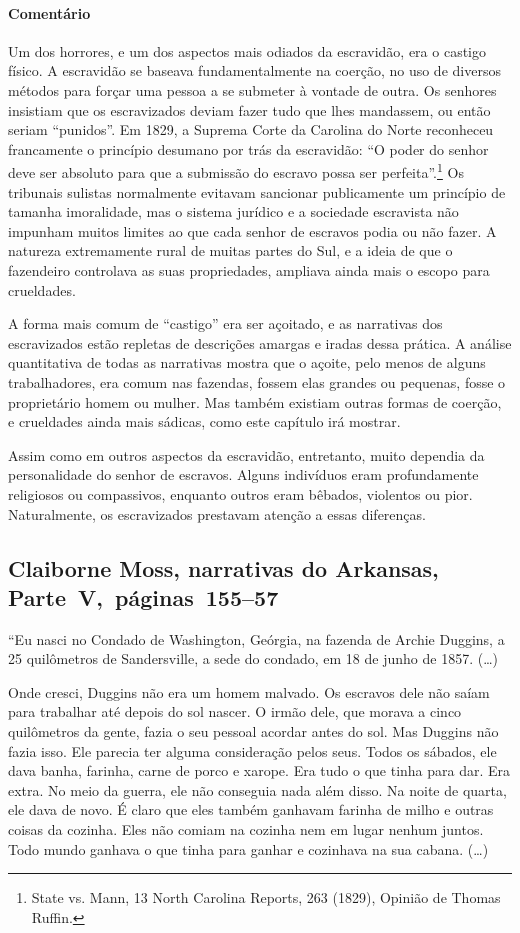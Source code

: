\paragraph{Comentário}\quad
{\small
Um dos horrores, e um dos aspectos mais odiados da escravidão, era
o castigo físico. A escravidão se baseava fundamentalmente na coerção,
no uso de diversos métodos para forçar uma pessoa a se submeter à
vontade de outra. Os senhores insistiam que os escravizados deviam fazer
tudo que lhes mandassem, ou então seriam ``punidos''. Em 1829, a Suprema
Corte da Carolina do Norte reconheceu francamente o princípio desumano
por trás da escravidão: ``O poder do senhor deve ser absoluto para que a
submissão do escravo possa ser perfeita''.\footnote{State vs. Mann, 13
  North Carolina Reports, 263 (1829), Opinião de Thomas Ruffin.}
Os tribunais sulistas normalmente evitavam sancionar publicamente
um princípio de tamanha imoralidade, mas o sistema jurídico e a
sociedade escravista não impunham muitos limites ao que cada senhor de
escravos podia ou não fazer. A natureza extremamente rural de muitas
partes do Sul, e a ideia de que o fazendeiro controlava as suas
propriedades, ampliava ainda mais o escopo para crueldades.

A forma mais comum de ``castigo'' era ser açoitado, e as
narrativas dos escravizados estão repletas de descrições amargas e iradas
dessa prática. A análise quantitativa de todas as narrativas mostra que
o açoite, pelo menos de alguns trabalhadores, era comum nas fazendas, fossem
elas grandes ou pequenas, fosse o proprietário homem ou mulher. Mas
também existiam outras formas de coerção, e crueldades ainda mais
sádicas, como este capítulo irá mostrar.

Assim como em outros aspectos da escravidão, entretanto, muito
dependia da personalidade do senhor de escravos. Alguns indivíduos eram
profundamente religiosos ou compassivos, enquanto outros eram bêbados,
violentos ou pior. Naturalmente, os escravizados prestavam atenção a essas
diferenças.
}

\subsection{Claiborne Moss, narrativas do Arkansas, Parte~V,~páginas~155--57}
\label{ref203}

``Eu nasci no Condado de Washington, Geórgia, na fazenda de Archie
Duggins, a 25 quilômetros de Sandersville, a sede do condado, em 18 de
junho de 1857. (\ldots{})

Onde cresci, Duggins não era um homem malvado. Os escravos dele não
saíam para trabalhar até depois do sol nascer. O irmão dele, que morava
a cinco quilômetros da gente, fazia o seu pessoal acordar antes do sol.
Mas Duggins não fazia isso. Ele parecia ter alguma consideração pelos
seus. Todos os sábados, ele dava banha, farinha, carne de porco e
xarope. Era tudo o que tinha para dar. Era extra. No meio da guerra, ele
não conseguia nada além disso. Na noite de quarta, ele dava de novo. É
claro que eles também ganhavam farinha de milho e outras coisas da
cozinha. Eles não comiam na cozinha nem em lugar nenhum juntos. Todo
mundo ganhava o que tinha para ganhar e cozinhava na sua cabana.
(\ldots{})

